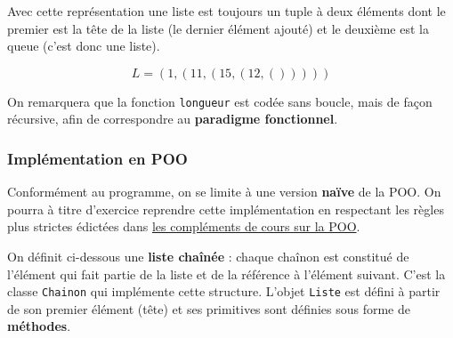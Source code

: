 \documentclass[
  letterpaper,
  DIV=11,
  numbers=noendperiod]{scrartcl}
\begin{document}
Avec cette représentation une liste est toujours un tuple à deux
éléments dont le premier est la tête de la liste (le dernier élément
ajouté) et le deuxième est la queue (c'est donc une liste).

\[L=(1, (11, (15, (12, ()))))\]

On remarquera que la fonction \texttt{longueur} est codée sans boucle,
mais de façon récursive, afin de correspondre au \textbf{paradigme
fonctionnel}.

\hypertarget{impluxe9mentation-en-poo}{%
\subsubsection{Implémentation en POO}\label{impluxe9mentation-en-poo}}

Conformément au programme, on se limite à une version \textbf{naïve} de
la POO. On pourra à titre d'exercice reprendre cette implémentation en
respectant les règles plus strictes édictées dans
\href{../langagesProgr/POO_complements.qmd}{les compléments de cours sur
la POO}.

On définit ci-dessous une \textbf{liste chaînée} : chaque chaînon est
constitué de l'élément qui fait partie de la liste et de la référence à
l'élément suivant. C'est la classe \texttt{Chainon} qui implémente cette
structure. L'objet \texttt{Liste} est défini à partir de son premier
élément (tête) et ses primitives sont définies sous forme de
\textbf{méthodes}.
\end{document}
